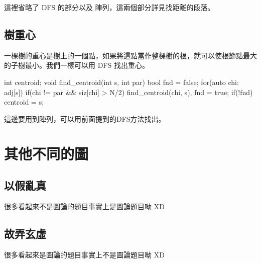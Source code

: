 這裡省略了 DFS 的部分以及  陣列，這兩個部分詳見找距離的段落。

\subsection{樹重心}
一棵樹的重心是樹上的一個點，如果將這點當作整棵樹的根，就可以使根節點最大的子樹最小。我們一樣可以用 DFS 找出重心。
\begin{C++}
int centroid;
void find_centroid(int s, int par){
    bool fnd = false;
    for(auto chi: adj[s]){
        if(chi != par && siz[chi] > N/2)
            find_centroid(chi, s), fnd = true;
    }
    if(!fnd) centroid = s;
}
\end{C++}
這邊要用到陣列，可以用前面提到的DFS方法找出。

\section{其他不同的圖}

\subsection{以假亂真}

很多看起來不是圖論的題目事實上是圖論題目呦 XD\\



\subsection{故弄玄虛}

很多看起來是圖論的題目事實上不是圖論題目呦 XD\\

